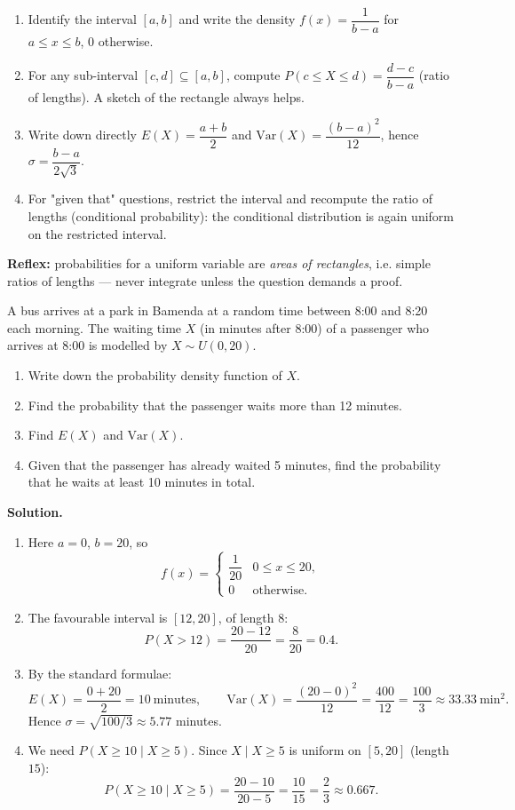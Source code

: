 \documentclass[11pt]{article}
\begin{document}
\begin{methode}
\begin{enumerate}
\item Identify the interval $[a,b]$ and write the density $f(x)=\dfrac{1}{b-a}$ for $a\le x\le b$, $0$ otherwise.
\item For any sub-interval $[c,d]\subseteq[a,b]$, compute $P(c\le X\le d)=\dfrac{d-c}{b-a}$ (ratio of lengths). A sketch of the rectangle always helps.
\item Write down directly $E(X)=\dfrac{a+b}{2}$ and $\mathrm{Var}(X)=\dfrac{(b-a)^2}{12}$, hence $\sigma=\dfrac{b-a}{2\sqrt{3}}$.
\item For "given that" questions, restrict the interval and recompute the ratio of lengths (conditional probability): the conditional distribution is again uniform on the restricted interval.
\end{enumerate}
\textbf{Reflex:} probabilities for a uniform variable are \emph{areas of rectangles}, i.e. simple ratios of lengths — never integrate unless the question demands a proof.
\end{methode}

\begin{exoresolu}
A bus arrives at a park in Bamenda at a random time between 8:00 and 8:20 each morning. The waiting time $X$ (in minutes after 8:00) of a passenger who arrives at 8:00 is modelled by $X\sim U(0,20)$.
\begin{enumerate}
\item Write down the probability density function of $X$.
\item Find the probability that the passenger waits more than 12 minutes.
\item Find $E(X)$ and $\mathrm{Var}(X)$.
\item Given that the passenger has already waited 5 minutes, find the probability that he waits at least 10 minutes in total.
\end{enumerate}
\tcblower
\textbf{Solution.}
\begin{enumerate}
\item Here $a=0$, $b=20$, so
\[ f(x)=\begin{cases} \dfrac{1}{20} & 0\le x\le 20,\\[2pt] 0 & \text{otherwise.}\end{cases} \]
\item The favourable interval is $[12,20]$, of length $8$:
\[ P(X>12)=\frac{20-12}{20}=\frac{8}{20}=0.4. \]
\item By the standard formulae:
\[ E(X)=\frac{0+20}{2}=10\ \text{minutes},\qquad \mathrm{Var}(X)=\frac{(20-0)^2}{12}=\frac{400}{12}=\frac{100}{3}\approx 33.33\ \text{min}^2. \]
Hence $\sigma=\sqrt{100/3}\approx 5.77$ minutes.
\item We need $P(X\ge 10\mid X\ge 5)$. Since $X\mid X\ge 5$ is uniform on $[5,20]$ (length $15$):
\[ P(X\ge 10\mid X\ge 5)=\frac{20-10}{20-5}=\frac{10}{15}=\frac{2}{3}\approx 0.667. \]
\end{enumerate}
\end{exoresolu}
\end{document}
